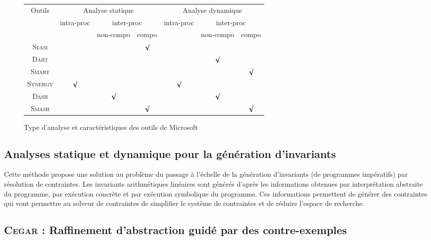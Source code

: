 \documentclass[french]{spimufcphdthesis}
\begin{document}
\begin{figure}
  \centering
  \begin{scriptsize}
    \begin{tabular}{|c|c|c|c|c|c|c|}
      \hline
      \multirow{3}{*}{Outils} & \multicolumn{3}{c|}{Analyse statique}
      & \multicolumn{3}{c|}{Analyse dynamique} \\
      & \multirow{2}{*}{intra-proc} & \multicolumn{2}{c|}{inter-proc}
      & \multirow{2}{*}{intra-proc} & \multicolumn{2}{c|}{inter-proc} \\
      & & non-compo & compo & & non-compo & compo \\
      \hline
      \textsc{Slam} \cite{SLAM} & & & $\surd$ & & & \\
      \hline
      \textsc{Dart} \cite{DART} & & & & & $\surd$ & \\
      \hline
    \textsc{Smart} \cite{SMART} & & & & & & $\surd$ \\
    \hline
    \textsc{Synergy} \cite{SYNERGY} & $\surd$ & & & $\surd$ & & \\
    \hline
    \textsc{Dash} \cite{DASH} & & $\surd$ & & & $\surd$ & \\
    \hline
    \textsc{Smash} \cite{SMASH} & & & $\surd$ & & & $\surd$ \\
    \hline
    \end{tabular}
  \end{scriptsize}
  \caption{Type d'analyse et caractéristiques des outils de Microsoft}
  \label{fig:microsoft-summary}
\end{figure}




\subsection{Analyses statique et dynamique pour la génération d'invariants}

Cette méthode \cite{fromTestsToProofs} propose une solution au problème du
passage à l'échelle de la génération d'invariants (de programmes impératifs) par
résolution de contraintes. Les invariants arithmétiques linéaires sont générés
d'après les informations obtenues par interprétation abstraite du programme, par
exécution concrète et par exécution symbolique du programme. Ces informations
permettent de générer des contraintes qui vont permettre au solveur de
contraintes de simplifier le système de contraintes et de réduire l'espace de
recherche.

\subsection{\textsc{Cegar} : Raffinement d'abstraction guidé par des
  contre-exemples}
\end{document}
